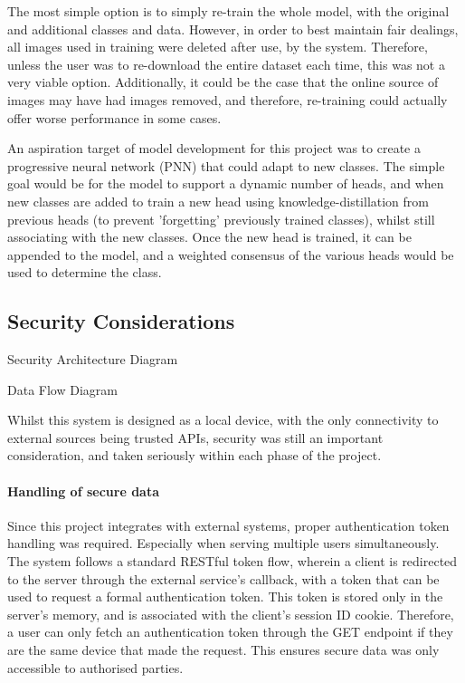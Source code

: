                 The most simple option is to simply re-train the whole model, with the original and additional classes and data. However, in order to best maintain fair dealings, all images used in training were deleted after use, by the system. Therefore, unless the user was to re-download the entire dataset each time, this was not a very viable option. Additionally, it could be the case that the online source of images may have had images removed, and therefore, re-training could actually offer worse performance in some cases.
    
                An aspiration target of model development for this project was to create a progressive neural network (PNN) that could adapt to new classes. The simple goal would be for the model to support a dynamic number of heads, and when new classes are added to train a new head using knowledge-distillation from previous heads (to prevent 'forgetting' previously trained classes), whilst still associating with the new classes. Once the new head is trained, it can be appended to the model, and a weighted consensus of the various heads would be used to determine the class.
    
        \subsection{Security Considerations} \label{sec:security}
    
            \begin{temp}
                Security Architecture Diagram
            \end{temp}
    
            \begin{temp}
                Data Flow Diagram
            \end{temp}
    
            Whilst this system is designed as a local device, with the only connectivity to external sources being trusted APIs, security was still an important consideration, and taken seriously within each phase of the project.
    
            \paragraph{Handling of secure data} Since this project integrates with external systems, proper authentication token handling was required. Especially when serving multiple users simultaneously. The system follows a standard RESTful token flow, wherein a client is redirected to the server through the external service's callback, with a token that can be used to request a formal authentication token. This token is stored only in the server's memory, and is associated with the client's session ID cookie. Therefore, a user can only fetch an authentication token through the GET endpoint if they are the same device that made the request. This ensures secure data was only accessible to authorised parties.
    
